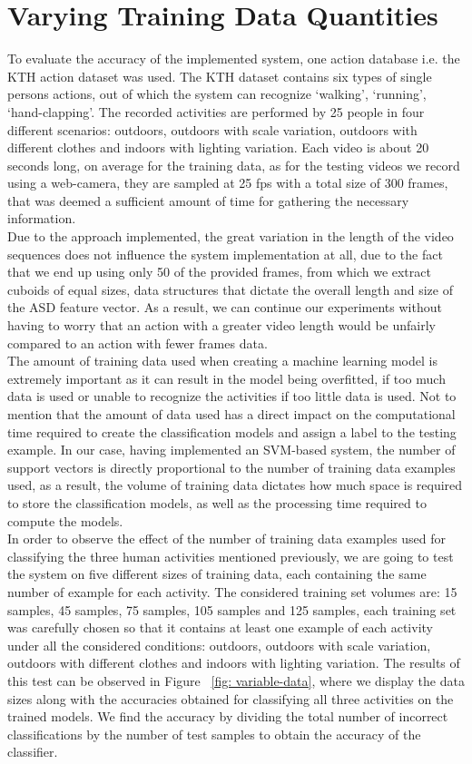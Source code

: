 \documentclass[11pt]{report}
\begin{document}
\section{Varying Training Data Quantities}
To evaluate the accuracy of the implemented system, one action database i.e. the KTH action dataset was used. The KTH dataset contains six types of single persons actions, out of which the system can recognize `walking', `running', `hand-clapping'. The recorded activities are performed by 25 people in four different scenarios: outdoors, outdoors with scale variation, outdoors with different clothes and indoors with lighting variation. Each video is about 20 seconds long, on average for the training data, as for the testing videos we record using a web-camera, they are sampled at 25 fps with a total size of 300 frames, that was deemed a sufficient amount of time for gathering the necessary information. \\
Due to the approach implemented, the great variation in the length of the video sequences does not influence the system implementation at all, due to the fact that we end up using only 50 of the provided frames, from which we extract cuboids of equal sizes, data structures that dictate the overall length and size of the ASD feature vector. As a result, we can continue our experiments without having to worry that an action with a greater video length would be unfairly compared to an action with fewer frames data. \\
The amount of training data used when creating a machine learning model is extremely important as it can result in the model being overfitted, if too much data is used or unable to recognize the activities if too little data is used. Not to mention that the amount of data used has a direct impact on the computational time required to create the classification models and assign a label to the testing example. In our case, having implemented an SVM-based system, the number of support vectors is directly proportional to the number of training data examples used, as a result, the volume of training data dictates how much space is required to store the classification models, as well as the processing time required to compute the models. \\
In order to observe the effect of the number of training data examples used for classifying the three human activities mentioned previously, we are going to test the system on five different sizes of training data, each containing the same number of example for each activity. The considered training set volumes are: 15 samples, 45 samples, 75 samples, 105 samples and 125 samples, each training set was carefully chosen so that it contains at least one example of each activity under all the considered conditions: outdoors, outdoors with scale variation, outdoors with different clothes and indoors with lighting variation. The results of this test can be observed in Figure ~\ref{fig: variable-data}, where we display the data sizes along with the accuracies obtained for classifying all three activities on the trained models. We find the accuracy by dividing the total number of incorrect classifications by the number of test samples to obtain the accuracy of the classifier.\\
\end{document}
